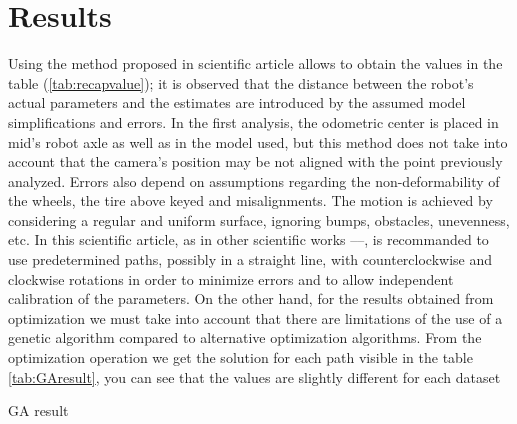 \section{Results}
Using the method proposed in scientific article \cite{1512356} allows to obtain the values in the table (\ref{tab:recapvalue}); it is observed that the distance between the robot’s actual parameters and the estimates are introduced by the assumed model simplifications and errors.
In the first analysis, the odometric center is placed in mid’s robot axle as well as in the model used, but this method does not take into account that the camera’s position may be not aligned with the point previously analyzed.
Errors also depend on assumptions regarding the non-deformability of the wheels, the tire above keyed and misalignments.
The motion is achieved by considering a regular and uniform surface, ignoring bumps, obstacles, unevenness, etc. 
In this scientific article, as in other scientific works \cite{censi13joint}--\cite{Jung2016}--\cite{DBLP:journals/ijrr/ChongK99}, is recommanded to use predetermined paths, possibly in a straight line, with counterclockwise and clockwise rotations in order to minimize errors and to allow independent calibration of the parameters.
On the other hand, for the results obtained from optimization we must take into account that there are limitations of the use of a genetic algorithm compared to alternative optimization algorithms.
From the optimization operation we get the solution for each path visible in the table \ref{tab:GAresult}, you can see that the values are slightly different for each dataset
\begin{table}[!h]
\centering
\begin{adjustbox}{max width=0.45\textwidth}
\end{adjustbox}
\caption{GA result}
\label{tab:GAresult}
\end{table}
